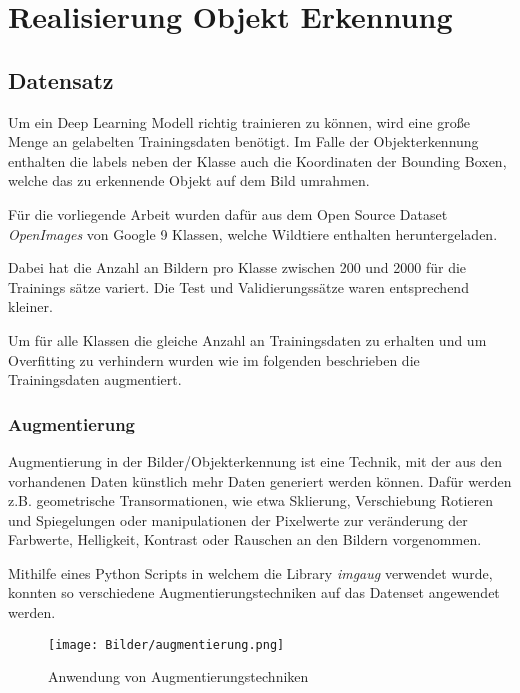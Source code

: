 \chapter{Realisierung Objekt Erkennung}\label{kap:object_det}

\section{Datensatz}\label{sec:dataset}

Um ein Deep Learning Modell richtig trainieren zu können, 
wird eine große Menge an gelabelten Trainingsdaten benötigt.
Im Falle der Objekterkennung enthalten die labels neben der 
Klasse auch die Koordinaten der Bounding Boxen, 
welche das zu erkennende Objekt auf dem Bild umrahmen.


Für die vorliegende Arbeit wurden dafür aus dem Open Source 
Dataset \textit{OpenImages} \cite{kuznetsovaOpenImagesDataset2018} 
von Google 9 Klassen, welche Wildtiere enthalten heruntergeladen.

Dabei hat die Anzahl an Bildern pro Klasse zwischen 
200 und 2000 für die Trainings sätze variert. Die Test und 
Validierungssätze waren entsprechend kleiner.

Um für alle Klassen die gleiche Anzahl an Trainingsdaten zu erhalten
und um Overfitting zu verhindern wurden wie im folgenden
beschrieben die Trainingsdaten augmentiert.


\subsection{Augmentierung}

Augmentierung in der Bilder/Objekterkennung ist eine Technik,
mit der aus den vorhandenen 
Daten künstlich mehr Daten generiert werden können. Dafür werden 
z.B. geometrische Transormationen, wie etwa Sklierung, Verschiebung 
Rotieren und Spiegelungen oder manipulationen der Pixelwerte 
zur veränderung der Farbwerte, Helligkeit, Kontrast oder 
Rauschen an den Bildern vorgenommen.

Mithilfe eines Python Scripts in welchem die Library \textit{imgaug} \cite{imgaug}
verwendet wurde, konnten so verschiedene
Augmentierungstechniken auf das Datenset angewendet werden.

\begin{figure}[H]
    \centering
    \label{fig:augmentierung}
    \texttt{[image: Bilder/augmentierung.png]}
    \caption{Anwendung von Augmentierungstechniken}
\end{figure}


